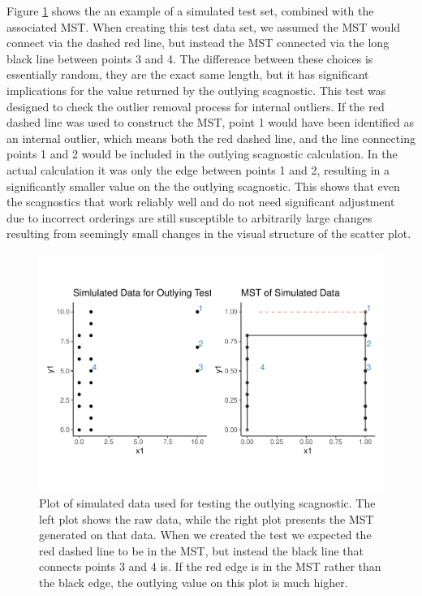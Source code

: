 Figure \ref{fig:outlying-test-plot} shows the an example of a simulated
test set, combined with the associated MST. When creating this test data
set, we assumed the MST would connect via the dashed red line, but
instead the MST connected via the long black line between points 3 and
4. The difference between these choices is essentially random, they are
the exact same length, but it has significant implications for the value
returned by the outlying scagnostic. This test was designed to check the
outlier removal process for internal outliers. If the red dashed line
was used to construct the MST, point 1 would have been identified as an
internal outlier, which means both the red dashed line, and the line
connecting points 1 and 2 would be included in the outlying scagnostic
calculation. In the actual calculation it was only the edge between
points 1 and 2, resulting in a significantly smaller value on the the
outlying scagnostic. This shows that even the scagnostics that work
reliably well and do not need significant adjustment due to incorrect
orderings are still susceptible to arbitrarily large changes resulting
from seemingly small changes in the visual structure of the scatter
plot.

\begin{Schunk}
\begin{figure}
\includegraphics[width=1\linewidth]{mason-lee-laa-cook_files/figure-latex/outlying-test-plot-1} \caption[Plot of simulated data used for testing the outlying scagnostic]{Plot of simulated data used for testing the outlying scagnostic. The left plot shows the raw data, while the right plot presents the MST generated on that data. When we created the test we expected the red dashed line to be in the MST, but instead the black line that connects points 3 and 4 is. If the red edge is in the MST rather than the black edge, the outlying value on this plot is much higher.}\label{fig:outlying-test-plot}
\end{figure}
\end{Schunk}

